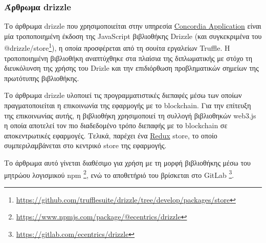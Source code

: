 \subsubsection{Άρθρωμα drizzle} \label{subsubsection:4-3-1-drizzle-unit}

Το άρθρωμα drizzle που χρησιμοποιείται στην υπηρεσία \hyperref[subsection:4-3-2-concordia-application-service]{Concordia Application} είναι μία τροποποιημένη έκδοση της JavaScript βιβλιοθήκης Drizzle (και συγκεκριμένα του @drizzle/store\footnote{\url{https://github.com/trufflesuite/drizzle/tree/develop/packages/store}}), η οποία προσφέρεται από τη σουίτα εργαλείων Truffle. Η τροποποιημένη βιβλιοθήκη αναπτύχθηκε στα πλαίσια της διπλωματικής με στόχο τη διευκόλυνση της χρήσης του Drizle και την επιδιόρθωση προβληματικών σημείων της πρωτότυπης βιβλιοθήκης.

Το άρθρωμα drizzle υλοποιεί τις προγραμματιστικές διεπαφές μέσω των οποίων πραγματοποιείται η επικοινωνία της εφαρμογής με το blockchain. Για την επίτευξη της επικοινωνίας αυτής, η βιβλιοθήκη χρησιμοποιεί τη συλλογή βιβλιοθηκών web3.js η οποία αποτελεί τον πιο διαδεδομένο τρόπο διεπαφής με το blockchain σε αποκεντρωτικές εφαρμογές. Τελικά, παρέχει ένα \hyperref[subsection:4-2-2-2-redux]{Redux} store, το οποίο συμπεριλαμβάνεται στο κεντρικό store της εφαρμογής.

Το άρθρωμα αυτό γίνεται διαθέσιμο για χρήση με τη μορφή βιβλιοθήκης μέσω του μητρώου λογισμικού npm \footnote{\url{https://www.npmjs.com/package/@ecentrics/drizzle}}, ενώ το αποθετήριό του βρίσκεται στο GitLab \footnote{\url{https://gitlab.com/ecentrics/drizzle}}.